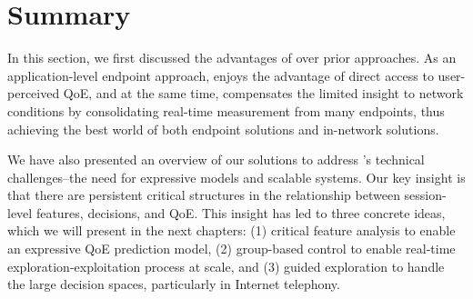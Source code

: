  


\section{Summary}

In this section, we first discussed the advantages of \ddn over prior approaches. 
As an application-level endpoint approach, \ddn enjoys the advantage of direct 
access to user-perceived QoE, and at the same time, compensates the limited 
insight to network conditions by consolidating real-time measurement from many 
endpoints, thus achieving the best world of both endpoint solutions and in-network 
solutions.

We have also presented an overview of our solutions to address \ddn's technical 
challenges--the need for expressive models and scalable systems. 
Our key insight is that there are persistent critical structures in the relationship 
between session-level features, decisions, and QoE.
This insight has led to three concrete ideas, which we will present in the next 
chapters: (1) critical feature analysis to enable an expressive QoE prediction model, 
(2) group-based control to enable real-time  exploration-exploitation process at 
scale, and (3) guided exploration to handle the large decision spaces, particularly in 
Internet telephony.







